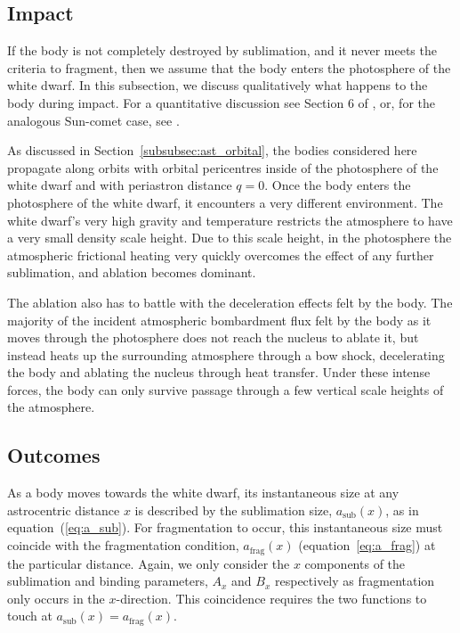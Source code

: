 \documentclass[fleqn,usenatbib]{mnras}
\begin{document}
\subsection{Impact} \label{subsec:impact}
If the body is not completely destroyed by sublimation, and it never meets the criteria to fragment, then we assume that the body enters the photosphere of the white dwarf. 
In this subsection, we discuss qualitatively what happens to the body during impact. For a quantitative discussion see Section 6 of \cite{Brown2017}, or, for the analogous Sun-comet case, see \cite{Brown2015}.

As discussed in Section~\ref{subsubsec:ast_orbital}, the bodies considered here propagate along orbits with orbital pericentres inside of the photosphere of the white dwarf and with periastron distance $q=0$.
Once the body enters the photosphere of the white dwarf, it encounters a very different environment. 
The white dwarf's very high gravity and temperature restricts the atmosphere to have a very small density scale height. 
Due to this scale height, in the photosphere the atmospheric frictional heating very quickly overcomes the effect of any further sublimation, and ablation becomes dominant.

The ablation also has to battle with the deceleration effects felt by the body. 
The majority of the incident atmospheric bombardment flux felt by the body as it moves through the photosphere does not reach the nucleus to ablate it, but instead heats up the surrounding atmosphere through a bow shock, decelerating the body and ablating the nucleus through heat transfer. 
Under these intense forces, the body can only survive passage through a few vertical scale heights of the atmosphere.

\subsection{Outcomes} \label{subsec:outcomes}
As a body moves towards the white dwarf, its instantaneous size at any astrocentric distance $x$ is described by the sublimation size, $a_\text{sub}(x)$, as in equation~(\ref{eq:a_sub}). 
For fragmentation to occur, this instantaneous size must coincide with the fragmentation condition, $a_\text{frag}(x)$ (equation~\ref{eq:a_frag}) at the particular distance. 
Again, we only consider the $x$ components of the sublimation and binding parameters, $A_x$ and $B_x$ respectively as fragmentation only occurs in the $x$-direction.
This coincidence requires the two functions to touch at $a_\text{sub}(x) = a_\text{frag}(x)$.
\end{document}
